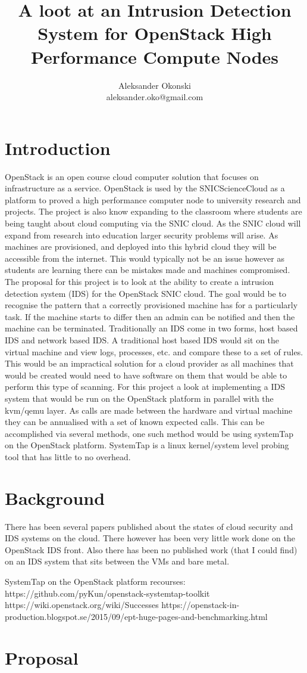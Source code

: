 \documentclass[12pt]{article}
\title{A loot at an Intrusion Detection System for OpenStack High Performance Compute Nodes}
\author{Aleksander Okonski \\ aleksander.oko@gmail.com}
\date{}
\begin{document}
\maketitle

\section{Introduction}
OpenStack is an open course cloud computer solution that focuses on infrastructure as a service. OpenStack is used by the SNICScienceCloud as a platform to proved a high performance computer node to university research and projects. The project is also know expanding to the classroom where students are being taught about cloud computing via the SNIC cloud. As the SNIC cloud will expand from research into education larger security problems will arise. As machines are provisioned, and deployed into this hybrid cloud they will be accessible from the internet. This would typically not be an issue however as students are learning there can be mistakes made and machines compromised. The proposal for this project is to look at the ability to create a intrusion detection system (IDS) for the OpenStack SNIC cloud. The goal would be to recognise the pattern that a correctly provisioned machine has for a particularly task. If the machine starts to differ then an admin can be notified and then the machine can be terminated. Traditionally an IDS come in two forms, host based IDS and network based IDS\@. A traditional host based IDS would sit on the virtual machine and view logs, processes, etc\@. and compare these to a set of rules. This would be an impractical solution for a cloud provider as all machines that would be created would need to have software on them that would be able to perform this type of scanning. For this project a look at implementing a IDS system that would be run on the OpenStack platform in parallel with the kvm/qemu layer. As calls are made between the hardware and virtual machine they can be annualised with a set of known expected calls. This can be accomplished via several methods, one such method would be using systemTap on the OpenStack platform. SystemTap is a linux kernel/system level probing tool that has little to no overhead.

\section{Background}
There has been several papers published about the states of cloud security and IDS systems on the cloud. There however has been very little work done on the OpenStack IDS front. Also there has been no published work (that I could find) on an IDS system that sits between the VMs and bare metal.


SystemTap on the OpenStack platform recourses:
https://github.com/pyKun/openstack-systemtap-toolkit
https://wiki.openstack.org/wiki/Successes
https://openstack-in-production.blogspot.se/2015/09/ept-huge-pages-and-benchmarking.html


\section{Proposal}
\end{document}
